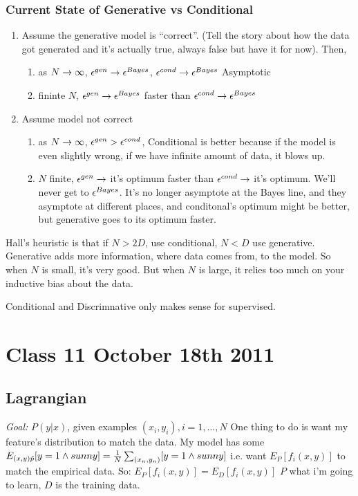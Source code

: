 \subsubsection{Current State of Generative vs Conditional}
\begin{enumerate}
\item Assume the generative model is ``correct''. (Tell the story
  about how the data got generated and it's actually true, always
  false but have it for now). Then,
  \begin{enumerate}
  \item as $N\rightarrow \infty$, $\epsilon^{gen} \rightarrow \epsilon^{Bayes}$,
    $\epsilon^{cond} \rightarrow \epsilon^{Bayes}$ Asymptotic

  \item fininte $N$, $\epsilon^{gen} \rightarrow \epsilon^{Bayes}$ faster than  $\epsilon^{cond}
    \rightarrow \epsilon^{Bayes}$ 
  \end{enumerate}
\item Assume model not correct
  \begin{enumerate}
  \item as $N\rightarrow \infty$, $\epsilon^{gen} > \epsilon^{cond}$, Conditional is
    better because if the model is even slightly wrong, if we have
    infinite amount of data, it blows up.
  \item $N$ finite, $\epsilon^{gen} \rightarrow $ it's optimum faster than
    $\epsilon^{cond}\rightarrow$ it's optimum. We'll never get to
    $\epsilon^{Bayes}$. It's no longer asymptote at the Bayes line, and
    they asymptote at different places, and conditonal's optimum might
    be better, but generative goes to its optimum faster.
  \end{enumerate}
\end{enumerate}
Hall's heuristic is that if $N>2D$, use conditional, $N<D$ use generative.
Generative adds more information, where data comes from, to
the model. So when $N$ is small, it's very good. But when $N$ is
large, it relies too much on your inductive bias about the data.

Conditional and Discrimnative only makes sense for supervised.

\pagebreak

\section{Class 11 October 18th 2011}

\subsection{Lagrangian}
\emph{Goal:} $P(y|x)$, given examples $(x_i, y_i), i=1,\dots,N$ One
thing to do is want my feature's distribution to match the data. My
model has some $E_{(x,y)\tilde p}[y=1 \wedge sunny] =
\frac{1}{N}\sum_{(x_n,y_n)}[y=1 \wedge sunny]$ 
i.e. want $E_P[f_i(x,y)]$ to match the empirical data. So:
$E_P[f_i(x,y)] = E_D[f_i(x,y)]$ $P$ what i'm going to
learn, $D$ is the training data.

